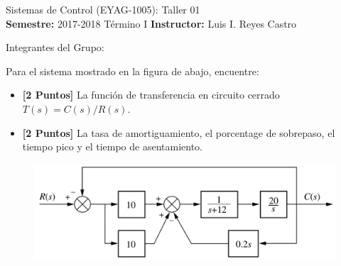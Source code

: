 \documentclass[ a4paper, twoside, 11pt]{article}
\newcommand{\numero}{01}
\begin{document}
\allowdisplaybreaks

\begin{center}
\Large Sistemas de Control (EYAG-1005): Taller \numero \\[1ex]
\small \textbf{Semestre:} 2017-2018 T\'ermino I \qquad
\textbf{Instructor:} Luis I. Reyes Castro
\end{center}
\halfskip

Integrantes del Grupo:
\fullskip
\fullskip
\fullskip

\begin{problem}
Para el sistema mostrado en la figura de abajo, encuentre: 
\begin{itemize}
\item \textbf{[2 Puntos]} La funci\'on de transferencia en circuito cerrado $T(s) = C(s) / R(s)$. 
\item \textbf{[2 Puntos]} La tasa de amortiguamiento, el porcentage de sobrepaso, el tiempo pico y el tiempo de asentamiento. 
\end{itemize}

\begin{figure}[htb]
\centering
\includegraphics[width=0.64\columnwidth]{Nise_Prob-5-17.jpg}
\end{figure}

\end{problem}
\fullskip
\end{document}
